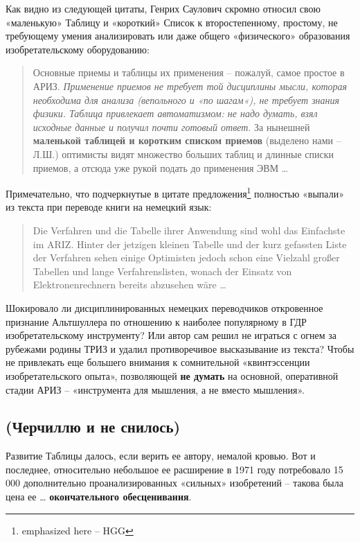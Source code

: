 \documentclass[11pt,a4paper]{article}
\begin{document}
Как видно из следующей цитаты, Генрих Саулович скромно относил свою
«маленькую» Таблицу и «короткий» Список к второстепенному, простому, не
требующему умения анализировать или даже общего «физического» образования
изобретательскому оборудованию:
\begin{quote}
  Основные приемы и таблицы их применения -- пожалуй, самое простое в АРИЗ.
  \emph{Применение приемов не требует той дисциплины мысли, которая необходима
    для анализа (вепольного и «по шагам«), не требует знания физики. Таблица
    привлекает автоматизмом: не надо думать, взял исходные данные и получил
    почти готовый ответ}. За нынешней \textbf{маленькой таблицей и коротким
    списком приемов} (выделено нами -- Л.Ш.) оптимисты видят множество больших
  таблиц и длинные списки приемов, а отсюда уже рукой подать до применения ЭВМ
  … \cite[с. 97]{Altshuller1979}
\end{quote}
Примечательно, что подчеркнутые в цитате предложения\footnote{emphasized here
  -- HGG} полностью «выпали» из текста при переводе книги на немецкий язык:
\begin{quote}
  Die Verfahren und die Tabelle ihrer Anwendung sind wohl das Einfachste im
  ARIZ. Hinter der jetzigen kleinen Tabelle und der kurz gefassten Liste der
  Verfahren sehen einige Optimisten jedoch schon eine Vielzahl großer Tabellen
  und lange Verfahrenslisten, wonach der Einsatz von Elektronenrechnern
  bereits abzusehen wäre … \cite{Altshuller1984a}
\end{quote}
Шокировало ли дисциплинированных немецких переводчиков откровенное признание
Альтшуллера по отношению к наиболее популярному в ГДР изобретательскому
инструменту? Или автор сам решил не играться с огнем за рубежами родины ТРИЗ и
удалил противоречивое высказывание из текста? Чтобы не привлекать еще большего
внимания к сомнительной «квинтэссенции изобретательского опыта», позволяющей
\textbf{не думать} на основной, оперативной стадии АРИЗ -- «инструмента для
мышления, а не вместо мышления».

\subsection*{(Черчиллю и не снилось)}

Развитие Таблицы далось, если верить ее автору, немалой кровью. Вот и
последнее, относительно небольшое ее расширение в 1971 году потребовало
15\,000 дополнительно проанализированных «сильных» изобретений -- такова была
цена ее …  \textbf{окончательного обесценивания}.
\end{document}
